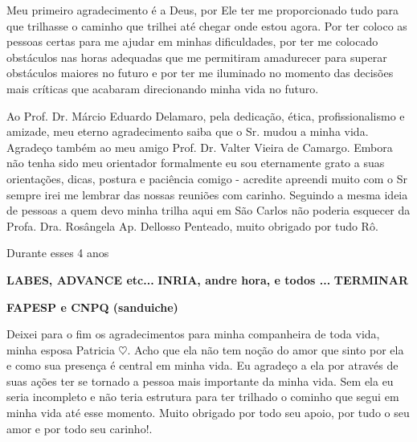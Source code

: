 

Meu primeiro agradecimento é a Deus, por Ele ter me proporcionado tudo para que trilhasse o caminho que trilhei até chegar onde estou agora. Por ter coloco as pessoas certas para me ajudar em minhas dificuldades, por ter me colocado obstáculos nas horas adequadas que me permitiram amadurecer para superar obstáculos maiores no futuro e por ter me iluminado no momento das decisões mais críticas que acabaram direcionando minha vida no futuro.


Ao Prof. Dr. Márcio Eduardo Delamaro, pela dedicação, ética, profissionalismo e amizade, meu eterno agradecimento saiba que o Sr. mudou a minha vida. Agradeço também ao meu amigo Prof. Dr. Valter Vieira de Camargo. Embora não tenha sido meu orientador formalmente eu sou eternamente grato a suas orientações, dicas, postura e paciência comigo - acredite apreendi muito com o Sr sempre irei me lembrar das nossas reuniões com carinho. Seguindo a mesma ideia de pessoas a quem devo minha trilha aqui em São Carlos não poderia esquecer da Profa. Dra. Rosângela Ap. Dellosso Penteado, muito obrigado por tudo Rô.

Durante esses 4 anos 

\textbf{LABES, ADVANCE etc...}
\textbf{INRIA, andre hora, e todos ...}
\textbf{TERMINAR}

\textbf{FAPESP e CNPQ (sanduiche)}

Deixei para o fim os agradecimentos para minha companheira de toda vida, minha esposa Patricia $\heartsuit$. Acho que ela não tem noção do amor que sinto por ela e como sua presença é central em minha vida. Eu agradeço a ela por através de suas ações ter se tornado a pessoa mais importante da minha vida. Sem ela eu seria incompleto e não teria estrutura para ter trilhado o cominho que segui em minha vida até esse momento. Muito obrigado por todo seu apoio, por tudo o seu amor e por todo seu carinho!.

